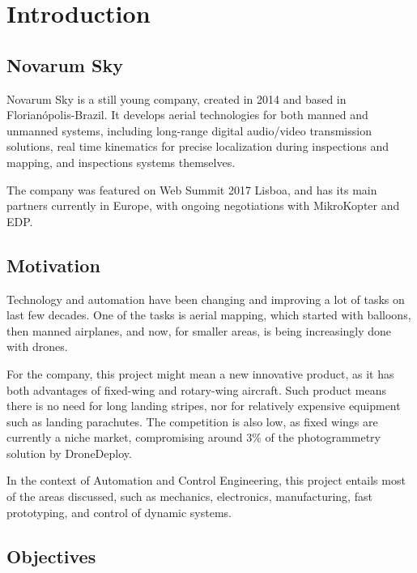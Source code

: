 

\chapter{Introduction} \label{chap:Introduction}


\section{Novarum Sky}
	Novarum Sky is a still young company, created in 2014 and based in Florianópolis-Brazil. It develops aerial technologies for both manned and unmanned systems, including long-range digital audio/video transmission solutions, real time kinematics for precise localization during inspections and mapping, and inspections systems themselves.

The company was featured on Web Summit 2017 Lisboa, and has its main partners currently in Europe, with ongoing negotiations with MikroKopter and EDP.

\section{Motivation}
Technology and automation have been changing and improving a lot of tasks on last few decades.
%
One of the tasks is aerial mapping, which started with balloons, then manned airplanes, and now, for smaller areas, is being increasingly done with drones\cite{dronesontherise}.
%

For the company, this project might mean a new innovative product, as it has both advantages of fixed-wing and rotary-wing aircraft.
Such product means there is no need for long landing stripes, nor for relatively expensive equipment such as landing parachutes. The competition is also low, as fixed wings are currently a niche market, compromising around 3\% of the photogrammetry solution by DroneDeploy\cite{dronedeployreport}.
%

In the context of Automation and Control Engineering, this project entails most of the areas discussed, such as mechanics, electronics, manufacturing, fast prototyping, and control of dynamic systems.
%	


\section{Objectives}

